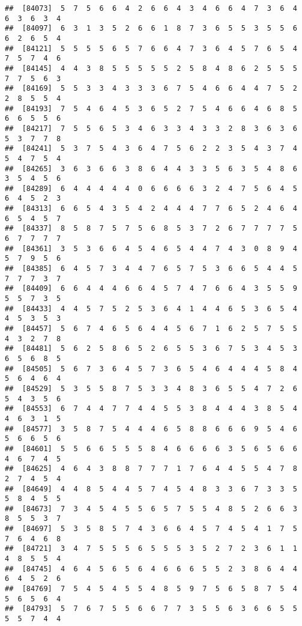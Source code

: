 \documentclass[
]{book}
\begin{document}
\begin{verbatim}
##  [84073]  5  7  5  6  6  4  2  6  6  4  3  4  6  6  4  7  3  6  4  6  3  6  3  4
##  [84097]  6  3  1  3  5  2  6  6  1  8  7  3  6  5  5  3  5  5  6  6  2  6  5  4
##  [84121]  5  5  5  5  6  5  7  6  6  4  7  3  6  4  5  7  6  5  4  7  5  7  4  6
##  [84145]  4  4  3  8  5  5  5  5  5  2  5  8  4  8  6  2  5  5  5  7  7  5  6  3
##  [84169]  5  5  3  3  4  3  3  3  6  7  5  4  6  6  4  4  7  5  2  2  8  5  5  4
##  [84193]  7  5  4  6  4  5  3  6  5  2  7  5  4  6  6  4  6  8  5  6  6  5  5  6
##  [84217]  7  5  5  6  5  3  4  6  3  3  4  3  3  2  8  3  6  3  6  5  3  7  7  8
##  [84241]  5  3  7  5  4  3  6  4  7  5  6  2  2  3  5  4  3  7  4  5  4  7  5  4
##  [84265]  3  6  3  6  6  3  8  6  4  4  3  3  5  6  3  5  4  8  6  3  5  4  5  6
##  [84289]  6  4  4  4  4  4  0  6  6  6  6  3  2  4  7  5  6  4  5  6  4  5  2  3
##  [84313]  6  6  5  4  3  5  4  2  4  4  4  7  7  6  5  2  4  6  4  6  5  4  5  7
##  [84337]  8  5  8  7  5  7  5  6  8  5  3  7  2  6  7  7  7  7  5  6  7  7  7  7
##  [84361]  3  5  3  6  6  4  5  4  6  5  4  4  7  4  3  0  8  9  4  5  7  9  5  6
##  [84385]  6  4  5  7  3  4  4  7  6  5  7  5  3  6  6  5  4  4  5  7  7  7  3  7
##  [84409]  6  6  4  4  4  6  6  4  5  7  4  7  6  6  4  3  5  5  9  5  5  7  3  5
##  [84433]  4  4  5  7  5  2  5  3  6  4  1  4  4  6  5  3  6  5  4  4  5  3  5  3
##  [84457]  5  6  7  4  6  5  6  4  4  5  6  7  1  6  2  5  7  5  5  4  3  2  7  8
##  [84481]  5  6  2  5  8  6  5  2  6  5  5  3  6  7  5  3  4  5  3  6  5  6  8  5
##  [84505]  5  6  7  3  6  4  5  7  3  6  5  4  6  4  4  4  5  8  4  5  6  4  6  4
##  [84529]  5  3  5  5  8  7  5  3  3  4  8  3  6  5  5  4  7  2  6  5  4  3  5  6
##  [84553]  6  7  4  4  7  7  4  4  5  5  3  8  4  4  4  3  8  5  4  4  6  3  1  5
##  [84577]  3  5  8  7  5  4  4  4  6  5  8  8  6  6  6  9  5  4  6  5  6  6  5  6
##  [84601]  5  5  6  6  5  5  5  8  4  6  6  6  6  3  5  6  5  6  6  4  6  7  4  5
##  [84625]  4  6  4  3  8  8  7  7  7  1  7  6  4  4  5  5  4  7  8  2  7  4  5  4
##  [84649]  4  4  8  5  4  4  5  7  4  5  4  8  3  3  6  7  3  3  5  5  8  4  5  5
##  [84673]  7  3  4  5  4  5  5  6  5  7  5  5  4  8  5  2  6  6  3  8  5  5  3  7
##  [84697]  5  3  5  8  5  7  4  3  6  6  4  5  7  4  5  4  1  7  5  7  6  4  6  8
##  [84721]  3  4  7  5  5  5  6  5  5  5  3  5  2  7  2  3  6  1  1  4  8  5  5  4
##  [84745]  4  6  4  5  6  5  6  4  6  6  6  5  5  2  3  8  6  4  4  6  4  5  2  6
##  [84769]  7  5  4  5  4  5  5  4  8  5  9  7  5  6  5  8  7  5  4  5  6  5  6  4
##  [84793]  5  7  6  7  5  5  6  6  7  7  3  5  5  6  3  6  6  5  5  5  5  7  4  4

\end{verbatim}
\end{document}
